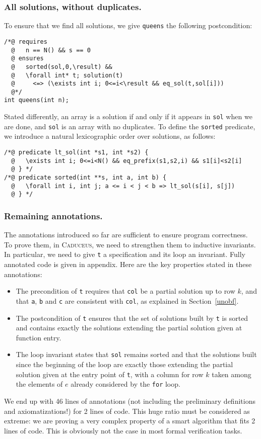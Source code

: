 \documentclass[a4paper]{llncs}
\newcommand{\caduceus}{\textsc{Caduceus}}
\begin{document}
\subsubsection{All solutions, without duplicates.}
To ensure that we find all solutions, we give \texttt{queens} the
following postcondition:
\begin{verbatim}
/*@ requires
  @   n == N() && s == 0
  @ ensures 
  @   sorted(sol,0,\result) &&
  @   \forall int* t; solution(t) 
  @     <=> (\exists int i; 0<=i<\result && eq_sol(t,sol[i]))
  @*/
int queens(int n);
\end{verbatim}
Stated differently, an array is a solution if and only if it appears in
\texttt{sol} when we are done, and \texttt{sol} is an
array with no duplicates. To define the
\texttt{sorted} predicate, we introduce a natural lexicographic order
over solutions, as follows:
\begin{verbatim}
/*@ predicate lt_sol(int *s1, int *s2) {
  @   \exists int i; 0<=i<N() && eq_prefix(s1,s2,i) && s1[i]<s2[i]
  @ } */
/*@ predicate sorted(int **s, int a, int b) {
  @   \forall int i, int j; a <= i < j < b => lt_sol(s[i], s[j])
  @ } */
\end{verbatim}

\subsubsection{Remaining annotations.} 
The annotations introduced so far are sufficient to ensure program
correctness. To prove them, in \caduceus, we need to strengthen them
to inductive invariants. In particular, we need
to give \texttt{t} a specification and its loop an invariant.
Fully annotated code is given in appendix. Here are the key properties
stated in these annotations:
\begin{itemize}
\item The precondition of \texttt{t} requires that \texttt{col} be a
  partial solution up to row $k$, and that \texttt{a},
  \texttt{b} and \texttt{c} are consistent with \texttt{col}, as
  explained in Section~\ref{unobf}.
\item The postcondition of \texttt{t} ensures that the set of
  solutions built by \texttt{t} is sorted and contains exactly the 
  solutions extending the partial solution given at function entry.
\item The loop invariant states that \texttt{sol} remains sorted and
  that the solutions built since the beginning of the loop are
  exactly those extending the partial solution given at the entry
  point of \texttt{t}, with a column for row $k$ taken among the
  elements of $e$ already considered by the \texttt{for} loop.
\end{itemize}
We end up with 46 lines of annotations (not including the preliminary
definitions and axiomatizations!) for 2 lines of code. This huge
ratio must be considered as extreme: we are proving a very complex
property of a smart algorithm that fits 2 lines of code. This
is obviously not the case in most formal verification tasks.
\end{document}
